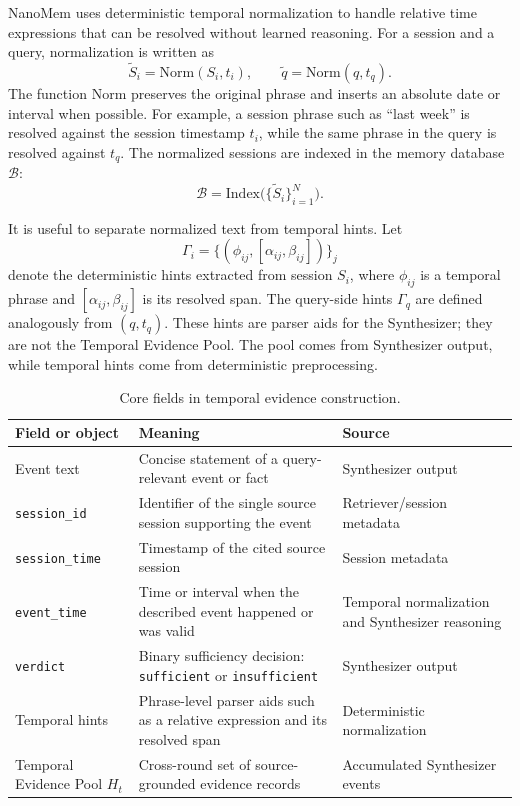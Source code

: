 NanoMem uses deterministic temporal normalization to handle relative time
expressions that can be resolved without learned reasoning. For a session and a
query, normalization is written as
\[
  \widetilde{S}_i=\mathrm{Norm}(S_i,t_i),
  \qquad
  \widetilde{q}=\mathrm{Norm}(q,t_q).
  \label{eq:normalization}
\]
The function $\mathrm{Norm}$ preserves the original phrase and inserts an
absolute date or interval when possible. For example, a session phrase such as
``last week'' is resolved against the session timestamp $t_i$, while the same
phrase in the query is resolved against $t_q$. The normalized sessions are
indexed in the memory database $\mathcal{B}$:
\[
  \mathcal{B}=\mathrm{Index}\bigl(\{\widetilde{S}_i\}_{i=1}^{N}\bigr).
\]

It is useful to separate normalized text from temporal hints. Let
\[
  \Gamma_i=\{(\phi_{ij},[\alpha_{ij},\beta_{ij}])\}_{j}
\]
denote the deterministic hints extracted from session $S_i$, where $\phi_{ij}$
is a temporal phrase and $[\alpha_{ij},\beta_{ij}]$ is its resolved span. The
query-side hints $\Gamma_q$ are defined analogously from $(q,t_q)$. These hints
are parser aids for the Synthesizer; they are not the Temporal Evidence Pool.
The pool comes from Synthesizer output, while temporal hints come from
deterministic preprocessing.

\begin{table}[H]
  \centering
  \caption{Core fields in temporal evidence construction.}
  \label{tab:methods-fields}
  \scriptsize
  \begin{tabular}{p{}p{}p{}}
    \hline\hline
    Field or object & Meaning & Source \\
    \hline
    Event text & Concise statement of a query-relevant event or fact & Synthesizer output \\
    \texttt{session\_id} & Identifier of the single source session supporting the event & Retriever/session metadata \\
    \texttt{session\_time} & Timestamp of the cited source session & Session metadata \\
    \texttt{event\_time} & Time or interval when the described event happened or was valid & Temporal normalization and Synthesizer reasoning \\
    \texttt{verdict} & Binary sufficiency decision: \texttt{sufficient} or \texttt{insufficient} & Synthesizer output \\
    Temporal hints & Phrase-level parser aids such as a relative expression and its resolved span & Deterministic normalization \\
    Temporal Evidence Pool $H_t$ & Cross-round set of source-grounded evidence records & Accumulated Synthesizer events \\
    \hline\hline
  \end{tabular}
\end{table}

